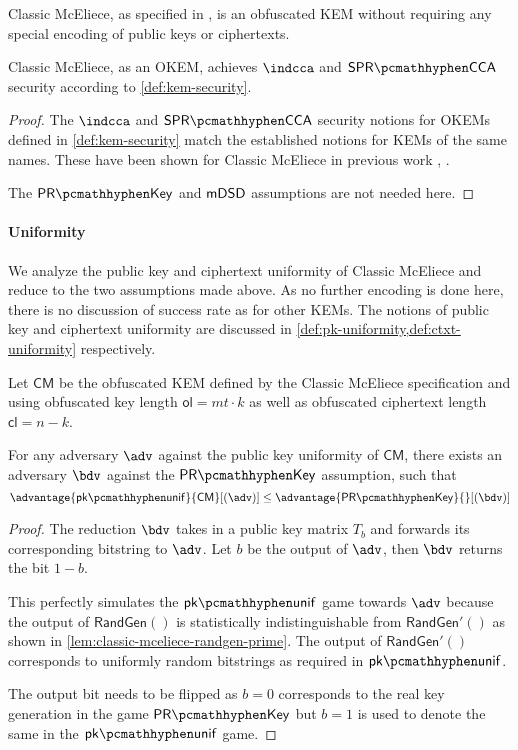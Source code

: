\begin{theorem}
    Classic McEliece, as specified in \cite{NISTPQC-R4:ClassicMcEliece22}, is an obfuscated KEM without requiring any special encoding of public keys or ciphertexts.

    Classic McEliece, as an OKEM, achieves $\indcca$ and $\sprcca$ security according to \cref{def:kem-security}.
\end{theorem}
\begin{proof}
    The $\indcca$ and $\sprcca$ security notions for OKEMs defined in \cref{def:kem-security} match the established notions for KEMs of the same names. These have been shown for Classic McEliece in previous work \cite{EC:Xagawa22}, \cite[security.pdf: Section 5]{NISTPQC-R4:ClassicMcEliece22}.

    The $\prkey$ and $\mathsf{mDSD}$ assumptions are not needed here.
\end{proof}

\paragraph{Uniformity}

We analyze the public key and ciphertext uniformity of Classic McEliece and reduce to the two assumptions made above. As no further encoding is done here, there is no discussion of success rate as for other KEMs.
The notions of public key and ciphertext uniformity are discussed in \cref{def:pk-uniformity,def:ctxt-uniformity} respectively.

\begin{lemma}
\label{lem:classic-mceliece-pk-unif}
    Let $\mathsf{CM}$ be the obfuscated KEM defined by the Classic McEliece specification \cite{NISTPQC-R4:ClassicMcEliece22} and using obfuscated key length $\mathsf{ol} = mt \cdot k$ as well as obfuscated ciphertext length $\mathsf{cl} = n-k$.
    
    For any adversary $\adv$ against the public key uniformity of $\mathsf{CM}$, there exists an adversary $\bdv$ against the $\prkey$ assumption, such that
    \[ \advantage{\pkunif}{\mathsf{CM}}[(\adv)] \leq \advantage{\prkey}{}[(\bdv)] \]
\end{lemma}
\begin{proof}
    The reduction $\bdv$ takes in a public key matrix $T_b$ and forwards its corresponding bitstring to $\adv$. Let $b$ be the output of $\adv$, then $\bdv$ returns the bit $1-b$.

    This perfectly simulates the $\pkunif$ game towards $\adv$ because the output of $\textsf{RandGen}()$ is statistically indistinguishable from $\textsf{RandGen}'()$ as shown in \cref{lem:classic-mceliece-randgen-prime}. The output of $\textsf{RandGen}'()$ corresponds to uniformly random bitstrings as required in $\pkunif$.

    The output bit needs to be flipped as $b=0$ corresponds to the real key generation in the game $\prkey$ but $b=1$ is used to denote the same in the $\pkunif$ game.
\end{proof}

